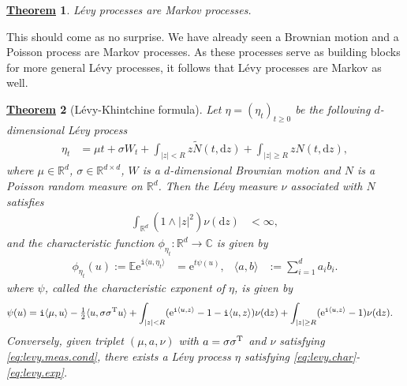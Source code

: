 \documentclass[12pt]{book}
\numberwithin{equation}{chapter}
\theoremstyle{plain}
\newtheorem{theorem}{\underline{Theorem}}
\numberwithin{theorem}{section}
\theoremstyle{definition}
\numberwithin{exercise}{chapter}
\newcommand{\<}{\langle}
\renewcommand{\>}{\rangle}
\renewcommand{\(}{\left(}
\renewcommand{\)}{\right)}
\renewcommand{\[}{\left[}
\renewcommand{\]}{\right]}
\newcommand\Cb{\mathds{C}}
\newcommand\Eb{\mathds{E}}
\newcommand\Rb{\mathds{R}}
\newcommand\sig{\sigma}
\newcommand\Nt{\widetilde{N}}
\newcommand\ii{\mathtt{i}}
\newcommand\dd{\mathrm{d}}
\newcommand\ee{\mathrm{e}}
\begin{document}
\begin{theorem}
L\'evy processes are Markov processes.
\end{theorem}

\noindent
This should come as no surprise.  We have already seen a Brownian motion and a Poisson process are Markov processes.  As these processes serve as building blocks for more general L\'evy processes, it follows that L\'evy processes are Markov as well.

\begin{theorem}[L\'evy-Khintchine formula]
Let $\eta = (\eta_t)_{t \geq 0}$ be the following $d$-dimensional L\'evy process
\begin{align}
\eta_t
	&=	\mu t + \sig W_t + \int_{|z| < R} z \Nt( t , \dd z ) + \int_{|z| \geq R} z N( t, \dd z) ,
\end{align}
where $\mu \in \Rb^d$, $\sig \in \Rb^{d \times d}$, $W$ is a $d$-dimensional Brownian motion and $N$ is a Poisson random measure on $\Rb^d$.
Then the L\'evy measure $\nu$ associated with $N$ satisfies
\begin{align}
\int_{\Rb^d} ( 1 \wedge |z|^2 ) \nu(\dd z)
	&<	\infty , \label{eq:levy.meas.cond}
\end{align}
and the characteristic function $\phi_{\eta_t} : \Rb^d \to \Cb$ is given by
\begin{align}
\phi_{\eta_t}(u) := \Eb \ee^{\ii \< u , \eta_t \> }
	&=	\ee^{t \psi(u)} , &
\< a , b \>
	&:=	\sum_{i=1}^d a_i b_i . \label{eq:levy.char}
\end{align}
where $\psi$, called the \emph{characteristic exponent of $\eta$}, is given by
\begin{align}
\psi(u)
	&=	\ii \< \mu , u \>  - \tfrac{1}{2} \< u , \sig \sig^\textup{T} u \> 
			+ \int_{|z| < R} (\ee^{\ii \< u , z\> } - 1 - \ii \< u , z\> ) \nu( \dd z ) + \int_{|z| \geq R} (\ee^{\ii \< u , z \>} - 1 ) \nu( \dd z ) . 
	\label{eq:levy.exp} 
\end{align}
Conversely, given triplet $(\mu, a, \nu)$ with $a = \sig \sig^\textup{T}$ and $\nu$ satisfying \eqref{eq:levy.meas.cond},
there exists a L\'evy process $\eta$ satisfying \eqref{eq:levy.char}-\eqref{eq:levy.exp}.
\end{theorem}
\end{document}
